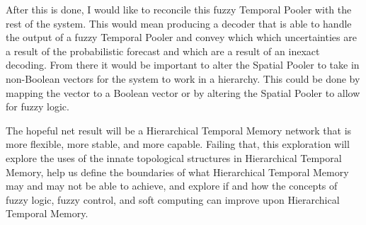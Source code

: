 \documentclass[fleqn,notitlepage,minimal]{article}
\begin{document}
	After this is done, I would like to reconcile this fuzzy Temporal Pooler with the rest of the system. This would mean producing a decoder that is able to handle the output of a fuzzy Temporal Pooler and convey which which uncertainties are a result of the probabilistic forecast and which are a result of an inexact decoding. From there it would be important to alter the Spatial Pooler to take in non-Boolean vectors for the system to work in a hierarchy. This could be done by mapping the vector to a Boolean vector or by altering the Spatial Pooler to allow for fuzzy logic.
	
	The hopeful net result will be a Hierarchical Temporal Memory network that is more flexible, more stable, and more capable. Failing that, this exploration will explore the uses of the innate topological structures in Hierarchical Temporal Memory, help us define the boundaries of what Hierarchical Temporal Memory may and may not be able to achieve, and explore if and how the concepts of fuzzy logic, fuzzy control, and soft computing can improve upon Hierarchical Temporal Memory.
	
	\newpage
	
\end{document}
